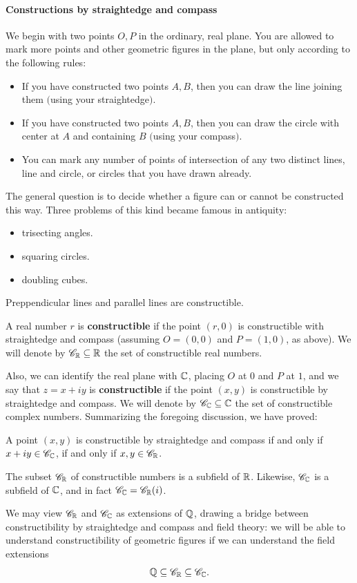 \paragraph{Constructions by straightedge and compass}
We begin with two points $O,P$ in the ordinary, real plane. You are allowed to mark more points and other geometric figures in the plane, but only according to the following rules:
\begin{itemize}
\item If you have constructed two points $A,B$, then you can draw the line joining them $($using your straightedge$)$.
\item If you have constructed two points $A,B$, then you can draw the circle with center at $A$ and containing $B$ $($using your compass$)$.
\item You can mark any number of points of intersection of any two distinct lines, line and circle, or circles that you have drawn already.
\end{itemize}
The general question is to decide whether a figure can or cannot be constructed this way. Three problems of this kind became famous in antiquity:
\begin{itemize}
\item trisecting angles.
\item squaring circles.
\item doubling cubes.
\end{itemize}
Preppendicular lines and parallel lines are constructible.
\begin{definition}
A real number $r$ is \textbf{constructible} if the point $(r,0)$ is constructible with straightedge and compass (assuming $O=(0,0)$ and $P=(1,0)$, as above). We will denote by $\mathscr{C}_{\mathbb{R}}\subseteq\mathbb{R}$ the set of constructible real numbers.
\end{definition}
Also, we can identify the real plane with $\mathbb{C}$, placing $O$ at $0$ and $P$ at $1$, and we say that $z=x+iy$ is \textbf{constructible} if the point $(x,y)$ is constructible by straightedge and compass. We will denote by $\mathscr{C}_{\mathbb{C}}\subseteq\mathbb{C}$ the set of constructible complex numbers.
Summarizing the foregoing discussion, we have proved:
\begin{proposition}
A point $(x,y)$ is constructible by straightedge and compass if and only if $x+iy\in\mathscr{C}_{\mathbb{C}}$, if and only if $x,y\in\mathscr{C}_{\mathbb{R}}$.
\end{proposition}
\begin{proposition}\label{field constructible number}
The subset $\mathscr{C}_{\mathbb{R}}$ of constructible numbers is a subfield of $\mathbb{R}$. Likewise, $\mathscr{C}_{\mathbb{C}}$ is a subfield of $\mathbb{C}$, and in fact $\mathscr{C}_{\mathbb{C}}=\mathscr{C}_{\mathbb{R}}(i)$.
\end{proposition}
We may view $\mathscr{C}_{\mathbb{R}}$ and $\mathscr{C}_{\mathbb{C}}$ as extensions of $\mathbb{Q}$, drawing a bridge between constructibility by straightedge and compass and field theory: we will be able to understand constructibility of geometric figures if we can understand the field extensions
\[\mathbb{Q}\subseteq\mathscr{C}_{\mathbb{R}}\subseteq\mathscr{C}_{\mathbb{C}}.\]
